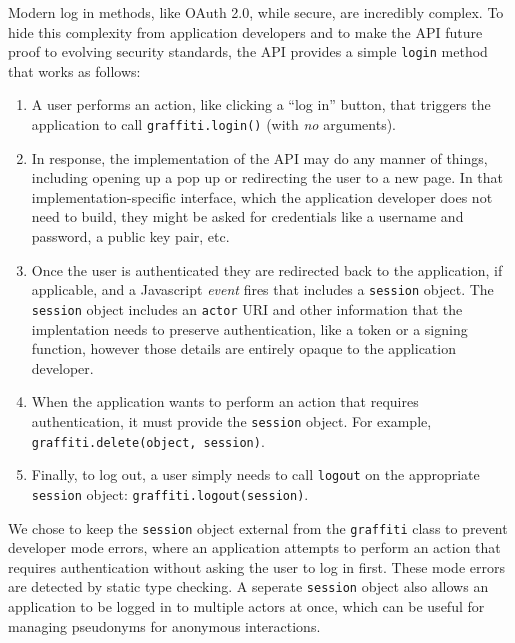 Modern log in methods, like OAuth 2.0, while secure, are incredibly complex.
To hide this complexity from application developers and to make the API future proof
to evolving security standards, the API provides a simple \texttt{login} method that works as follows:

\begin{enumerate}
\item
A user performs an action, like clicking a ``log in'' button, that triggers
the application to call \texttt{graffiti.login()} (with \emph{no} arguments).
\item
In response, the implementation of the API may do any manner of things,
including opening up a pop up or redirecting the user to a new page.
In that implementation-specific interface, which the application developer
does not need to build, they might be asked for credentials like a username
and password, a public key pair, etc.
\item
Once the user is authenticated they are redirected back to the application, if applicable,
and a Javascript \emph{event} fires that includes
a \texttt{session} object. The \texttt{session} object includes an \texttt{actor}
URI and other information that the implentation needs to preserve authentication, like
a token or a signing function, however those details are entirely opaque to the application developer.
\item
When the application wants to perform an action that requires authentication,
it must provide the \texttt{session} object. For example,
\texttt{graffiti.delete(object, session)}.
\item
Finally, to log out, a user simply needs to call \texttt{logout} on the appropriate
\texttt{session} object: \texttt{graffiti.logout(session)}.
\end{enumerate}

We chose to keep the \texttt{session} object external from the \texttt{graffiti} class
to prevent developer mode errors, where an application attempts to perform an action
that requires authentication without asking the user to log in first.
These mode errors are detected by static type checking.
A seperate \texttt{session} object also allows an application to be logged in to
multiple actors at once, which can be useful for managing pseudonyms for anonymous interactions.



